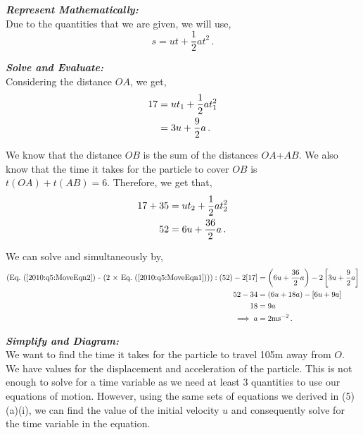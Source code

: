 \begin{subquestions}
\begin{subsubquestions}
\textbf{\textit{Represent Mathematically:}} \\
Due to the quantities that we are given, we will use,
\begin{equation}
	s = ut + \frac{1}{2}at^2 \,.
\end{equation}




\textbf{\textit{Solve and Evaluate:}} \\
Considering the distance $OA$, we get,
\begin{align}
	17 & = ut_1 + \frac{1}{2}at_1^2 \nonumber \\
	& = 3u + \frac{9}{2}a \,. \label{2010:q5:MoveEqn1}
\end{align}

We know that the distance $OB$ is the sum of the distances $OA$+$AB$. We also know that the time it takes for the particle to cover $OB$ is $t(OA)+t(AB)=6$. Therefore, we get that,
\begin{align}
	17+35 & = ut_2 + \frac{1}{2}at_2^2 \nonumber \\
	52 & = 6u + \frac{36}{2}a \,. \label{2010:q5:MoveEqn2}
\end{align}

We can solve  and  simultaneously by,
\begin{align}
	\text{(\req{2010:q5:MoveEqn2} - (2 $\times$ \req{2010:q5:MoveEqn1}))}:(52) - 2[17] & = \left(6u + \frac{36}{2}a\right) - 2\left[3u + \frac{9}{2}a\right] \nn \\
	                                                              52 - 34 & = \left(6u + 18a\right) - \left[6u + 9a\right] \nn \\
	                                                                   18 & = 9a \nn \\
	                                                                   \implies a & = 2\text{ms}^{-2} \,.
\end{align}


\subsubquestion

\textbf{\textit{Simplify and Diagram:}} \\
We want to find the time it takes for the particle to travel 105m away from $O$. We have values for the displacement and acceleration of the particle. This is not enough to solve for a time variable as we need at least 3 quantities to use our equations of motion. However, using the same sets of equations we derived in (5)(a)(i), we can find the value of the initial velocity $u$ and consequently solve for the time variable in the equation. \\





\end{subsubquestions}
\end{subquestions}
